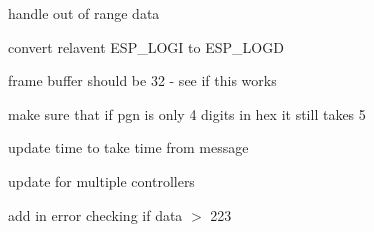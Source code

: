 
\begin{DoxyRefList}
\item[Member \mbox{\hyperlink{main_8cpp_a955ad07241382211a8efdeaa2307443a}{Handle\+NMEA2000\+Msg}} (const t\+N2k\+Msg \&N2k\+Msg)]\label{todo__todo000006}%
%
handle out of range data  
\item[File \mbox{\hyperlink{main_8cpp}{main.cpp}} ]\label{todo__todo000001}%
%
convert relavent ESP\+\_\+\+LOGI to ESP\+\_\+\+LOGD  
\item[Member \mbox{\hyperlink{main_8cpp_abcaa9f46955f9eaa3af477ed9e5c9d53}{N2\+K\+\_\+task}} (void $\ast$pv\+Parameters)]\label{todo__todo000005}%
%
frame buffer should be 32 -\/ see if this works  
\item[Member \mbox{\hyperlink{main_8cpp_ac9bab62089a524c93c540021803c6009}{nmea\+\_\+to\+\_\+string}} (\mbox{\hyperlink{structNMEA__msg}{NMEA\+\_\+msg}} \&msg)]\label{todo__todo000002}%
%
make sure that if pgn is only 4 digits in hex it still takes 5  
\item[Member \mbox{\hyperlink{main_8cpp_ac894d2ff5b41ee9ca73d7adb560d9416}{Send\+N2k\+Msg}} ()]\label{todo__todo000004}%
%
update time to take time from message 

update for multiple controllers 
\item[Member \mbox{\hyperlink{main_8cpp_a09ae4e0a7dffdbfb9a499ce4874a5778}{vector\+To\+Char\+Array}} (const std\+::vector$<$ uint8\+\_\+t $>$ \&data\+\_\+vec, unsigned char(\&data\+\_\+char\+\_\+arr)\mbox{[}223\mbox{]})]\label{todo__todo000003}%
%
add in error checking if data $>$ 223 
\end{DoxyRefList}